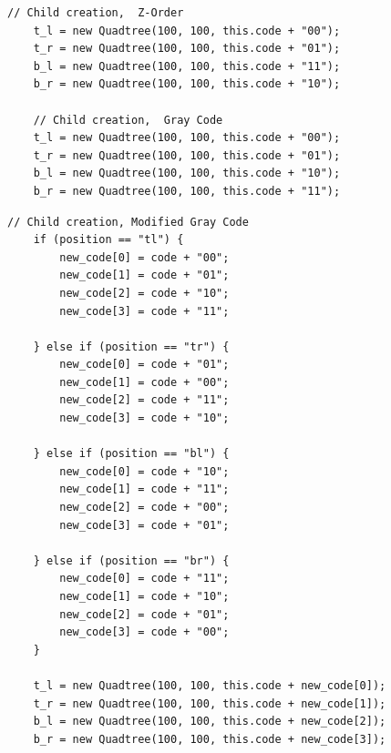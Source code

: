 \begin{center}
\begin{minipage}{\textwidth}
\begin{lstlisting}[caption={[Code to generate the children of the current
	quadtree using Z- and Gray ordering.]Code to generate children of the
	current quadtree while maintaining the correct ordering. Z- and Gray
	ordering.}, label=code:child_construction]
	// Child creation,  Z-Order
	t_l = new Quadtree(100, 100, this.code + "00");
	t_r = new Quadtree(100, 100, this.code + "01");
	b_l = new Quadtree(100, 100, this.code + "11");
	b_r = new Quadtree(100, 100, this.code + "10");

	// Child creation,  Gray Code
	t_l = new Quadtree(100, 100, this.code + "00");
	t_r = new Quadtree(100, 100, this.code + "01");
	b_l = new Quadtree(100, 100, this.code + "10");
	b_r = new Quadtree(100, 100, this.code + "11");
\end{lstlisting}
\end{minipage}
\end{center}

\begin{center}
\begin{minipage}{\textwidth}
\begin{lstlisting}[caption={[Code to generate the children of the current
	quadtree using modified Gray ordering.]Code to generate children of the
	current quadtree while maintaining the correct ordering. Modified Gray code
	order. Since the ordering is different for each quadrant, the ordering is
	changed depending on the position of the current node.},
	label=code:child_construction_mgc]
	// Child creation, Modified Gray Code
	if (position == "tl") {
		new_code[0] = code + "00";
		new_code[1] = code + "01";
		new_code[2] = code + "10";
		new_code[3] = code + "11";

	} else if (position == "tr") {
		new_code[0] = code + "01";
		new_code[1] = code + "00";
		new_code[2] = code + "11";
		new_code[3] = code + "10";

	} else if (position == "bl") {
		new_code[0] = code + "10";
		new_code[1] = code + "11";
		new_code[2] = code + "00";
		new_code[3] = code + "01";

	} else if (position == "br") {
		new_code[0] = code + "11";
		new_code[1] = code + "10";
		new_code[2] = code + "01";
		new_code[3] = code + "00";
	}

	t_l = new Quadtree(100, 100, this.code + new_code[0]);
	t_r = new Quadtree(100, 100, this.code + new_code[1]);
	b_l = new Quadtree(100, 100, this.code + new_code[2]);
	b_r = new Quadtree(100, 100, this.code + new_code[3]);
\end{lstlisting}
\end{minipage}
\end{center}

